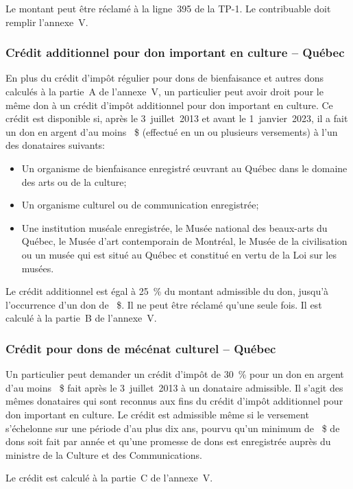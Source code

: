 Le montant peut être réclamé à la ligne~395 de la TP-1. Le contribuable doit remplir l'annexe~V.

\subsubsection{Crédit additionnel pour don important en culture -- Québec}
En plus du crédit d'impôt régulier pour dons de bienfaisance et autres dons calculés à la partie~A de l'annexe~V, un particulier peut avoir droit pour le même don à un crédit d'impôt additionnel pour don important en culture. Ce crédit est disponible si, après le 3~juillet~2013 et avant le 1\ier{}~janvier~2023, il a fait un don en argent d'au moins ~\$ (effectué en un ou plusieurs versements) à l'un des donataires suivants:
\begin{itemize}
	\item Un organisme de bienfaisance enregistré œuvrant au Québec dans le domaine des arts ou de la culture;
	\item Un organisme culturel ou de communication enregistrée;
	\item Une institution muséale enregistrée, le Musée national des beaux-arts du Québec, le Musée d'art contemporain de Montréal, le Musée de la civilisation ou un musée qui est situé au Québec et constitué en vertu de la Loi sur les musées.
\end{itemize}

Le crédit additionnel est égal à 25~\% du montant admissible du don, jusqu'à l'occurrence d'un don de ~\$. Il ne peut être réclamé qu'une seule fois. Il est calculé à la partie~B de l'annexe~V.

\subsubsection{Crédit pour dons de mécénat culturel -- Québec}
Un particulier peut demander un crédit d'impôt de 30~\% pour un don en argent d'au moins ~\$ fait après le 3~juillet~2013 à un donataire admissible. Il s'agit des mêmes donataires qui sont reconnus aux fins du crédit d'impôt additionnel pour don important en culture. Le crédit est admissible même si le versement s'échelonne sur une période d'au plus dix ans, pourvu qu'un minimum de ~\$ de dons soit fait par année et qu'une promesse de dons est enregistrée auprès du ministre de la Culture et des Communications.

Le crédit est calculé à la partie~C de l'annexe~V. 

